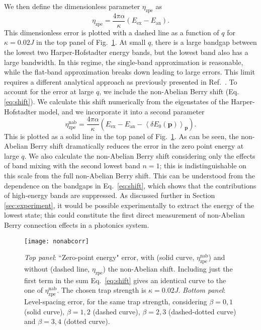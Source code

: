 \documentclass[twocolumn, 10pt, aps, superscriptaddress, floatfix, showpacs, pra, citeautoscript]{revtex4-1}
\newcommand{\vt}[1]{\mathbf{#1}}
\begin{document}
We then define the dimensionless parameter $\eta_{\text{zpe}}$ as 
\begin{equation}
\eta_{\text{zpe}} = \frac{4\pi\alpha}{\kappa} (E_{\text{ex}} -E_{\text{an}}). 
\end{equation}
This dimensionless error is plotted with a dashed line as a function of $q$ for $\kappa=0.02 J$ in the top panel of Fig.~\ref{fig:zpe}. At small $q$, there is a large bandgap between the lowest two Harper-Hofstadter energy bands, but the lowest band also has a large bandwidth. In this regime, the single-band approximation is reasonable, while the flat-band approximation breaks down leading to large errors. This limit requires a different analytical approach as  previously presented in Ref.~.
To account for the error at large $q$, we include the non-Abelian Berry shift (Eq. \ref{eq:shift}). We calculate this shift numerically from the eigenstates of the Harper-Hofstadter model, and we incorporate it into a second parameter 
\begin{equation}
\eta_{\text{zpe}}^{\text{nab}} = \frac{4\pi\alpha}{\kappa}(E_{\text{ex}} - E_{\text{an}} - \left<\delta  E_0(\vt{p})\right>_{\vt{p}}).
\end{equation}
This is plotted as a solid line in the top panel of Fig.~\ref{fig:zpe}. As can be seen, the non-Abelian Berry shift dramatically reduces the error in the zero point energy at large $q$. We also calculate the non-Abelian Berry shift considering only the effects of band mixing with the second lowest band $n=1$; this is indistinguishable on this scale from the full non-Abelian Berry shift. This can be understood from the dependence on the bandgaps in Eq.~\ref{eq:shift}, which shows that the contributions of high-energy bands are suppressed. As discussed further in Section \ref{sec:experiment}, it would be possible experimentally to extract the energy of the lowest state; this could constitute the first direct measurement of non-Abelian Berry connection effects in a photonics system.

\begin{figure}[tb]\centering
  \texttt{[image: nonabcorr]} %
  \caption{\emph{Top panel}: ``Zero-point energy" error, with (solid curve,
    $\eta_{\text{zpe}}^{\text{nab}}$) and without (dashed line,
    $\eta_{\text{zpe}}$) the non-Abelian shift. Including just the
    first term in the sum Eq.~\eqref{eq:shift} gives an identical
    curve to the one of $\eta_{\text{zpe}}^{\text{nab}}$. The chosen
    trap strength is $\kappa = 0.02 J$.  \emph{Bottom panel}: Level-spacing
    error, for the same trap strength, considering $\beta = 0,1$
    (solid curve), $\beta = 1,2$ (dashed curve), $\beta = 2,3$
    (dashed-dotted curve) and $\beta = 3,4$ (dotted curve).}
  \label{fig:zpe}
\end{figure}
\end{document}
